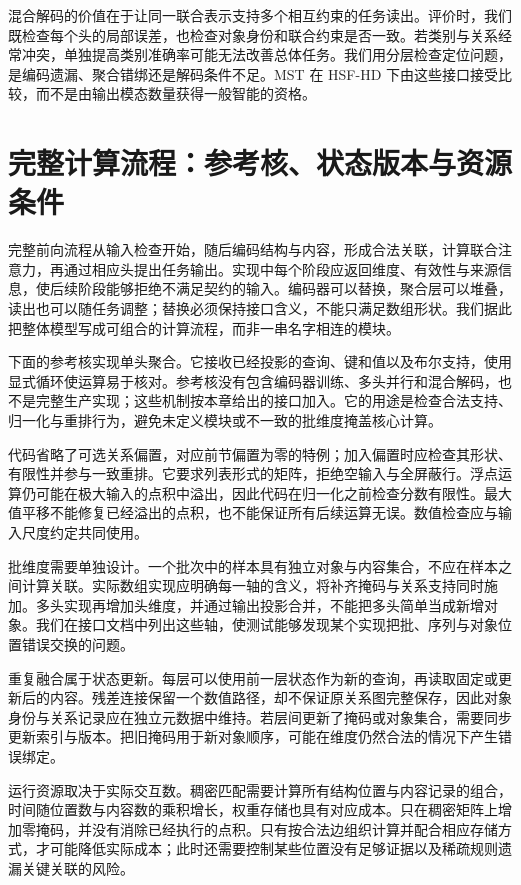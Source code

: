 混合解码的价值在于让同一联合表示支持多个相互约束的任务读出。评价时，我们既检查每个头的局部误差，也检查对象身份和联合约束是否一致。若类别与关系经常冲突，单独提高类别准确率可能无法改善总体任务。我们用分层检查定位问题，是编码遗漏、聚合错绑还是解码条件不足。MST 在 HSF-HD 下由这些接口接受比较，而不是由输出模态数量获得一般智能的资格。

\section{完整计算流程：参考核、状态版本与资源条件}
\label{sec:mst_complete}

完整前向流程从输入检查开始，随后编码结构与内容，形成合法关联，计算联合注意力，再通过相应头提出任务输出。实现中每个阶段应返回维度、有效性与来源信息，使后续阶段能够拒绝不满足契约的输入。编码器可以替换，聚合层可以堆叠，读出也可以随任务调整；替换必须保持接口含义，不能只满足数组形状。我们据此把整体模型写成可组合的计算流程，而非一串名字相连的模块。

下面的参考核实现单头聚合。它接收已经投影的查询、键和值以及布尔支持，使用显式循环使运算易于核对。参考核没有包含编码器训练、多头并行和混合解码，也不是完整生产实现；这些机制按本章给出的接口加入。它的用途是检查合法支持、归一化与重排行为，避免未定义模块或不一致的批维度掩盖核心计算。




代码省略了可选关系偏置，对应前节偏置为零的特例；加入偏置时应检查其形状、有限性并参与一致重排。它要求列表形式的矩阵，拒绝空输入与全屏蔽行。浮点运算仍可能在极大输入的点积中溢出，因此代码在归一化之前检查分数有限性。最大值平移不能修复已经溢出的点积，也不能保证所有后续运算无误。数值检查应与输入尺度约定共同使用。

批维度需要单独设计。一个批次中的样本具有独立对象与内容集合，不应在样本之间计算关联。实际数组实现应明确每一轴的含义，将补齐掩码与关系支持同时施加。多头实现再增加头维度，并通过输出投影合并，不能把多头简单当成新增对象。我们在接口文档中列出这些轴，使测试能够发现某个实现把批、序列与对象位置错误交换的问题。

重复融合属于状态更新。每层可以使用前一层状态作为新的查询，再读取固定或更新后的内容。残差连接保留一个数值路径，却不保证原关系图完整保存，因此对象身份与关系记录应在独立元数据中维持。若层间更新了掩码或对象集合，需要同步更新索引与版本。把旧掩码用于新对象顺序，可能在维度仍然合法的情况下产生错误绑定。

运行资源取决于实际交互数。稠密匹配需要计算所有结构位置与内容记录的组合，时间随位置数与内容数的乘积增长，权重存储也具有对应成本。只在稠密矩阵上增加零掩码，并没有消除已经执行的点积。只有按合法边组织计算并配合相应存储方式，才可能降低实际成本；此时还需要控制某些位置没有足够证据以及稀疏规则遗漏关键关联的风险。

